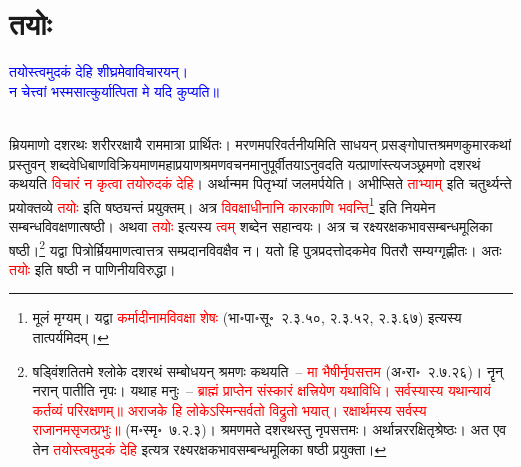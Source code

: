 \section[तयोः]{तयोः}
\centering\textcolor{blue}{तयोस्त्वमुदकं देहि शीघ्रमेवाविचारयन्।\nopagebreak\\
न चेत्त्वां भस्मसात्कुर्यात्पिता मे यदि कुप्यति॥}\nopagebreak\\
\\
\begin{sloppypar}\justifying\noindent\hspace{10mm} म्रियमाणो दशरथः शरीर\-रक्षायै राम\-मात्रा प्रार्थितः। मरणमपरि\-वर्तनीयमिति साधयन् प्रसङ्गोपात्त\-श्रमण\-कुमार\-कथां प्रस्तुवन् शब्द\-वेधि\-बाण\-विक्रियमाण\-महा\-प्रयाण\-श्रमण\-वचनमानुपूर्वीतयाऽनुवदति यत्प्राणांस्त्यजञ्छ्रमणो दशरथं कथयति \textcolor{red}{विचारं न कृत्वा तयोरुदकं देहि}।
अर्थान्मम पितृभ्यां जलमर्पयेति। अभीप्सिते \textcolor{red}{ताभ्याम्‌} इति चतुर्थ्यन्ते प्रयोक्तव्ये \textcolor{red}{तयोः} इति षष्ठ्यन्तं प्रयुक्तम्। अत्र \textcolor{red}{विवक्षाधीनानि कारकाणि भवन्ति}\footnote{मूलं मृग्यम्। यद्वा \textcolor{red}{कर्मादीनामविवक्षा शेषः} (भा॰पा॰सू॰~२.३.५०, २.३.५२, २.३.६७) इत्यस्य तात्पर्यमिदम्।} इति नियमेन सम्बन्ध\-विवक्षणात्षष्ठी। अथवा \textcolor{red}{तयोः} इत्यस्य \textcolor{red}{त्वम्‌} शब्देन सहान्वयः। अत्र च रक्ष्य\-रक्षक\-भाव\-सम्बन्ध\-मूलिका षष्ठी।\footnote{षड्विंशतितमे श्लोके दशरथं सम्बोधयन् श्रमणः कथयति~– \textcolor{red}{मा भैषीर्नृपसत्तम} (अ॰रा॰~२.७.२६)। नॄन् नरान् पातीति नृपः। यथाह मनुः~– \textcolor{red}{ब्राह्मं प्राप्तेन संस्कारं क्षत्त्रियेण यथाविधि। सर्वस्यास्य यथान्यायं कर्तव्यं परिरक्षणम्॥ अराजके हि लोकेऽस्मिन्सर्वतो विद्रुतो भयात्। रक्षार्थमस्य सर्वस्य राजानमसृजत्प्रभुः॥} (म॰स्मृ॰~७.२.३)। श्रमणमते दशरथस्तु नृपसत्तमः। अर्थान्नररक्षितृश्रेष्ठः। अत एव तेन \textcolor{red}{तयोस्त्वमुदकं देहि} इत्यत्र रक्ष्य\-रक्षक\-भाव\-सम्बन्ध\-मूलिका षष्ठी प्रयुक्ता।} यद्वा पित्रोर्म्रियमाणत्वात्तत्र सम्प्रदान\-विवक्षैव न। यतो हि पुत्र\-प्रदत्तोदकमेव पितरौ सम्यग्गृह्णीतः। अतः \textcolor{red}{तयोः} इति षष्ठी न पाणिनीय\-विरुद्धा।\end{sloppypar}
